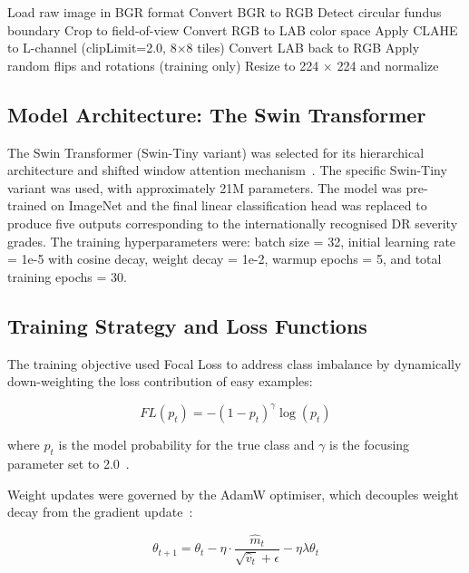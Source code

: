 \documentclass[10pt,twoside]{article}
\begin{document}
\begin{algorithm}[ht]
\caption{Retinal Image Pre-processing Pipeline}\label{alg:preprocessing}
\begin{algorithmic}[1]
\State Load raw image in BGR format
\State Convert BGR to RGB
\State Detect circular fundus boundary
\State Crop to field-of-view
\State Convert RGB to LAB color space
\State Apply CLAHE to L-channel (clipLimit=2.0, 8$\times$8 tiles)
\State Convert LAB back to RGB
\State Apply random flips and rotations (training only)
\State Resize to 224 $\times$ 224 and normalize
\end{algorithmic}
\end{algorithm}

\subsection{Model Architecture: The Swin Transformer}

The Swin Transformer (Swin-Tiny variant) was selected for its hierarchical architecture and shifted window attention mechanism~\cite{liu2021swin}. The specific Swin-Tiny variant was used, with approximately 21M parameters. The model was pre-trained on ImageNet and the final linear classification head was replaced to produce five outputs corresponding to the internationally recognised DR severity grades. The training hyperparameters were: batch size = 32, initial learning rate = 1e-5 with cosine decay, weight decay = 1e-2, warmup epochs = 5, and total training epochs = 30.

\subsection{Training Strategy and Loss Functions}

The training objective used Focal Loss to address class imbalance by dynamically down-weighting the loss contribution of easy examples:

\begin{equation}
\label{eq:focal}
FL(p_t) = -(1 - p_t)^\gamma \log(p_t)
\end{equation}

\noindent where $p_t$ is the model probability for the true class and $\gamma$ is the focusing parameter set to 2.0~\cite{lin2020focal}.

Weight updates were governed by the AdamW optimiser, which decouples weight decay from the gradient update~\cite{loshchilov2019adamw}:

\begin{equation}
\label{eq:adamw}
\theta_{t+1} = \theta_t - \eta \cdot \frac{\hat{m}_t}{\sqrt{\hat{v}_t} + \epsilon} - \eta \lambda \theta_t
\end{equation}
\end{document}
